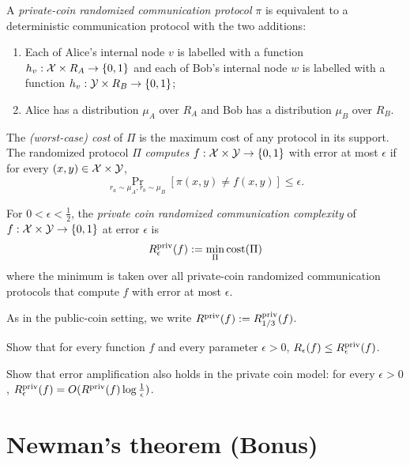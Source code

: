 \begin{definition}
A \emph{private-coin randomized communication protocol} $\pi$ is equivalent to a deterministic communication protocol with the two additions: 
\begin{enumerate}
\item Each of Alice's internal node $v$ is labelled with a function $h_v : \mathcal{X} \times R_A \to \{0,1\}$ and each of Bob's internal node $w$ is labelled with a function $h_v : \mathcal{Y} \times R_B \to \{0,1\}$; 
\item Alice has a distribution $\mu_A$ over $R_A$ and Bob has a distribution $\mu_B$ over $R_B$.
\end{enumerate}
The \emph{(worst-case) cost} of $\Pi$ is the maximum cost of any protocol in its support. The randomized protocol $\Pi$ \emph{computes} $f : \mathcal{X} \times \mathcal{Y} \to \{0,1\}$ with error at most $\epsilon$ if for every $(x,y) \in \mathcal{X} \times \mathcal{Y}$,
\[
\Pr_{r_a \sim \mu_A, r_b \sim \mu_B}[ \pi(x,y) \neq f(x,y) ] \le \epsilon.
\]
\end{definition}


\begin{definition}
For $0 < \epsilon < \frac12$, the \emph{private coin randomized communication complexity} of $f : \mathcal{X} \times \mathcal{Y} \to \{0,1\}$ at error $\epsilon$ is
\[
R^{\mathrm{priv}}_\epsilon(f) := \min_{\Pi} \mathrm{cost}(\Pi)
\]
where the minimum is taken over all private-coin randomized communication protocols that compute $f$ with error at most $\epsilon$.
\end{definition}

\begin{remark}
As in the public-coin setting, we write $R^{\mathrm{priv}}(f) := R^{\mathrm{priv}}_{1/3}(f)$.
\end{remark}
\exercises

\begin{exercise}
Show that for every function $f$ and every parameter $\epsilon > 0$, 
$R_\epsilon(f) \le R^{\mathrm{priv}}_\epsilon(f)$.
\end{exercise}

\begin{exercise}
Show that error amplification also holds in the private coin model: for every $\epsilon > 0$, $R^{\mathrm{priv}}_\epsilon(f) = O(R^{\mathrm{priv}}(f) \log \frac1\epsilon)$.
\end{exercise}


\newpage 
\section{Newman's theorem (Bonus)}

